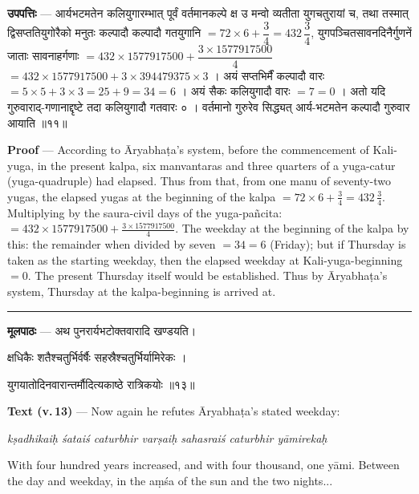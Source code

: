 \documentclass[11pt,a4paper]{article}
\newcommand{\skt}[1]{{\devanagarifont\color{sktcolor} #1}}
\newenvironment{bilingual}{%
  \par\noindent
  \begin{minipage}[t]{0.47\textwidth}%
}{%
  \par\end{minipage}%
}
\newcommand{\rightcol}{%
  \par\end{minipage}%
  \hfill
  \begin{minipage}[t]{0.47\textwidth}%
}
\begin{document}
\medskip

\begin{bilingual}
\textbf{उपपत्तिः} --- \skt{आर्यभटमतेन कलियुगारम्भात् पूर्वं वर्तमानकल्पे क्ष उ मन्वो व्यतीता युगचतुरायां च, तथा तस्मात् द्विसप्ततियुगोरैको मनुतः कल्पादौ कल्पादौ गतयुगानि} $= 72 \times 6 + \dfrac{3}{4} = 432\,\dfrac{3}{4}$, \skt{युगपञ्चितसावनदिनैर्गुणनें जाताः सावनाहर्गणाः} $= 432 \times 1577917500 + \dfrac{3 \times 1577917500}{4}$ $= 432 \times 1577917500 + 3 \times 394479375 \times 3$ । \skt{अयं सप्तभिर्मैं कल्पादौ वारः} $= 5 \times 5 + 3 \times 3 = 25 + 9 = 34 = 6$ । \skt{अयं सैकः कलियुगादौ वारः} $= 7 = 0$ । \skt{अतो यदि गुरुवाराद्-गणानाद्दृष्टे तदा कलियुगादौ गतवारः ० । वर्तमानो गुरुरेव सिद्ध्यत् आर्य-भटमतेन कल्पादौ गुरुवार आयाति} ॥११॥
\rightcol
\textbf{Proof} --- According to Āryabhaṭa's system, before the commencement of Kali-yuga, in the present kalpa, six manvantaras and three quarters of a yuga-catur (yuga-quadruple) had elapsed. Thus from that, from one manu of seventy-two yugas, the elapsed yugas at the beginning of the kalpa $= 72 \times 6 + \frac{3}{4} = 432\,\frac{3}{4}$. Multiplying by the saura-civil days of the yuga-pañcita: $= 432 \times 1577917500 + \frac{3 \times 1577917500}{4}$. The weekday at the beginning of the kalpa by this: the remainder when divided by seven $= 34 = 6$ (Friday); but if Thursday is taken as the starting weekday, then the elapsed weekday at Kali-yuga-beginning $= 0$. The present Thursday itself would be established. Thus by Āryabhaṭa's system, Thursday at the kalpa-beginning is arrived at.
\end{bilingual}

\medskip
\noindent\rule{\textwidth}{0.4pt}

\begin{bilingual}
\textbf{मूलपाठः} --- \skt{अथ पुनरार्यभटोक्तवारादि खण्डयति}।

\skt{क्षधिकैः शतैश्चतुर्भिर्वर्षैः सहस्रैश्चतुर्भिर्यामिरेकः} ।

\skt{युगयातोदिनवारान्तर्मौदित्यकाष्ठे रात्रिकयोः} ॥१३॥
\rightcol
\textbf{Text (v.\,13)} --- Now again he refutes Āryabhaṭa's stated weekday:

\textit{kṣadhikaiḥ śataiś caturbhir varṣaiḥ sahasraiś caturbhir yāmirekaḥ}

With four hundred years increased, and with four thousand, one yāmi. Between the day and weekday, in the aṃśa of the sun and the two nights...
\end{bilingual}

\medskip
\end{document}
